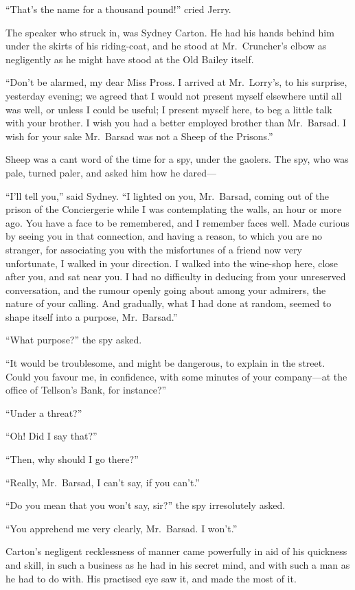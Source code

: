 ``That's the name for a thousand pound!'' cried Jerry.

The speaker who struck in, was Sydney Carton.  He had his hands
behind him under the skirts of his riding-coat, and he stood at
Mr.\ Cruncher's elbow as negligently as he might have stood at the Old
Bailey itself.

``Don't be alarmed, my dear Miss Pross.  I arrived at Mr.\ Lorry's,
to his surprise, yesterday evening; we agreed that I would not
present myself elsewhere until all was well, or unless I could be
useful; I present myself here, to beg a little talk with your brother.
I wish you had a better employed brother than Mr.\ Barsad.  I wish
for your sake Mr.\ Barsad was not a Sheep of the Prisons.''

Sheep was a cant word of the time for a spy, under the gaolers.
The spy, who was pale, turned paler, and asked him how he dared---%

``I'll tell you,'' said Sydney.  ``I lighted on you, Mr.\ Barsad, coming
out of the prison of the Conciergerie while I was contemplating the
walls, an hour or more ago.  You have a face to be remembered, and I
remember faces well.  Made curious by seeing you in that connection,
and having a reason, to which you are no stranger, for associating
you with the misfortunes of a friend now very unfortunate, I walked
in your direction.  I walked into the wine-shop here, close after you,
and sat near you.  I had no difficulty in deducing from your unreserved
conversation, and the rumour openly going about among your admirers,
the nature of your calling.  And gradually, what I had done at random,
seemed to shape itself into a purpose, Mr.\ Barsad.''

``What purpose?'' the spy asked.

``It would be troublesome, and might be dangerous, to explain in the
street.  Could you favour me, in confidence, with some minutes of
your company---at the office of Tellson's Bank, for instance?''

``Under a threat?''

``Oh!  Did I say that?''

``Then, why should I go there?''

``Really, Mr.\ Barsad, I can't say, if you can't.''

``Do you mean that you won't say, sir?'' the spy irresolutely asked.

``You apprehend me very clearly, Mr.\ Barsad.  I won't.''

Carton's negligent recklessness of manner came powerfully in aid of
his quickness and skill, in such a business as he had in his secret
mind, and with such a man as he had to do with.  His practised eye
saw it, and made the most of it.

